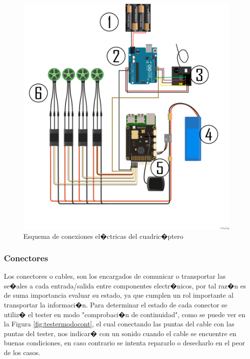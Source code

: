\begin{figure}[h!]
	\centering
	\includegraphics[width=0.9\linewidth, height=0.6\textheight]{Imagenes/esquema-hardware}
	\caption{Esquema de conexiones el�ctricas del cuadric�ptero}
	\label{fig:esquema-hardware}
\end{figure}

\subsubsection{Conectores}

Los conectores o cables, son los encargados de comunicar o transportar las se�ales a cada entrada/salida entre componentes electr�nicos, por tal raz�n es de suma importancia evaluar su estado, ya que cumplen un rol importante al transportar la informaci�n. Para determinar el estado de cada conector se utiliz� el tester en modo "comprobaci�n de continuidad", como se puede ver en la Figura \ref{fig:testermodocont},  el cual conectando las puntas del cable con las puntas del tester, nos indicar� con un sonido cuando el cable se encuentre en buenas condiciones, en caso contrario se intenta repararlo o desecharlo en el peor de los casos.

